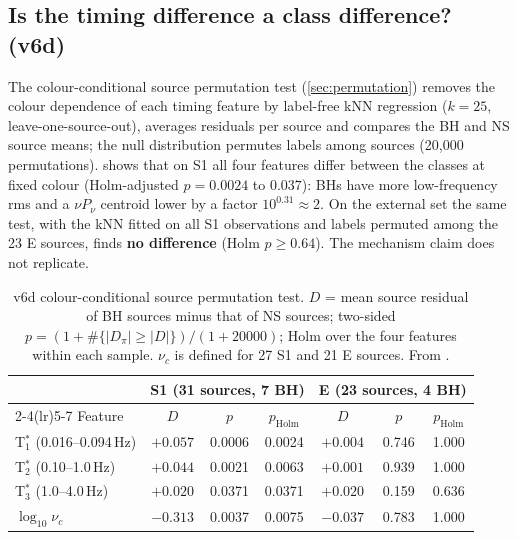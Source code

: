 \subsection{Is the timing difference a class difference? (v6d)}\label{sec:p3perm}
\Secondary{} The colour-conditional source permutation test (\cref{sec:permutation}) removes the colour dependence of
each timing feature by label-free kNN regression ($k=25$, leave-one-source-out), averages residuals per source and
compares the BH and NS source means; the null distribution permutes labels among sources (20,000 permutations).
 shows that on S1 all four features differ between the classes at fixed colour (Holm-adjusted
$p=0.0024$ to $0.037$): BHs have more low-frequency rms and a $\nu P_\nu$ centroid lower by a factor $10^{0.31}\approx2$.
On the external set the same test, with the kNN fitted on all S1 observations and labels permuted among the 23 E
sources, finds \textbf{no difference} (Holm $p\ge0.64$). The mechanism claim does not replicate.

\begin{table}[htbp]
\centering\small
\caption[Colour-conditional permutation test]{\Secondary{} v6d colour-conditional source permutation test. $D$ = mean
source residual of BH sources minus that of NS sources; two-sided $p=(1+\#\{|D_\pi|\ge|D|\})/(1+20000)$; Holm over the four
features within each sample. $\nu_c$ is defined for 27 S1 and 21 E sources. From
.}
\label{tab:p3perm}
\begin{tabular}{@{}lcccccc@{}}
\toprule
 & \multicolumn{3}{c}{S1 (31 sources, 7 BH)} & \multicolumn{3}{c}{E (23 sources, 4 BH)} \\
\cmidrule(lr){2-4}\cmidrule(lr){5-7}
Feature & $D$ & $p$ & $p_\mathrm{Holm}$ & $D$ & $p$ & $p_\mathrm{Holm}$ \\
\midrule
T$^*_1$ (0.016--0.094\,Hz) & $+0.057$ & 0.0006 & 0.0024 & $+0.004$ & 0.746 & 1.000 \\
T$^*_2$ (0.10--1.0\,Hz) & $+0.044$ & 0.0021 & 0.0063 & $+0.001$ & 0.939 & 1.000 \\
T$^*_3$ (1.0--4.0\,Hz) & $+0.020$ & 0.0371 & 0.0371 & $+0.020$ & 0.159 & 0.636 \\
$\log_{10}\nu_c$ & $-0.313$ & 0.0037 & 0.0075 & $-0.037$ & 0.783 & 1.000 \\
\bottomrule
\end{tabular}
\end{table}

